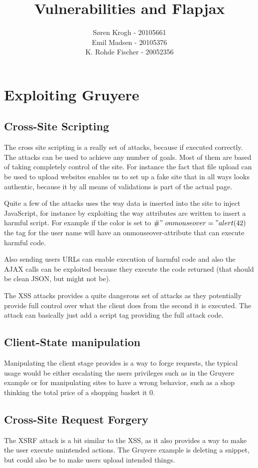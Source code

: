 \documentclass[a4paper,10pt]{article}
\title{Vulnerabilities and Flapjax}
\author{Søren Krogh -  20105661 \\
Emil Madsen - 20105376  \\
K. Rohde Fischer - 20052356\\}
\begin{document}
\maketitle

\section*{Exploiting Gruyere}
\subsection*{Cross-Site Scripting}
The cross site scripting is a really set of attacks, because if
executed correctly.  The attacks can be used to achieve any number of
goals.  Most of them are based of taking completely control of the
site.  For instance the fact that file upload can be used to upload
websites enables us to set up a fake site that in all ways looks
authentic, because it by all means of validations is part of the
actual page.

Quite a few of the attacks uses the way data is inserted into the site
to inject JavaScript, for instance by exploiting the way attributes
are written to insert a harmful script.  For example if the color is
set to $\#"~onmouseover="alert(42)$ the tag for the user name will
have an onmouseover-attribute that can execute harmful code.

Also sending users URLs can enable execution of harmful code and also
the AJAX calls can be exploited because they execute the code returned
(that should be clean JSON, but might not be).

The XSS attacks provides a quite dangerous set of attacks as they
potentially provide full control over what the client does from the
second it is executed.  The attack can basically just add a script tag
providing the full attack code.

\subsection*{Client-State manipulation}
Manipulating the client stage provides is a way to forge requests, the
typical usage would be either escalating the users privileges such as
in the Gruyere example or for manipulating sites to have a wrong
behavior, such as a shop thinking the total price of a shopping basket
it 0.

\subsection*{Cross-Site Request Forgery}
The XSRF attack is a bit similar to the XSS, as it also provides a way
to make the user execute unintended actions.  The Gruyere example is
deleting a snippet, but could also be to make users upload intended
things.  
\end{document}
